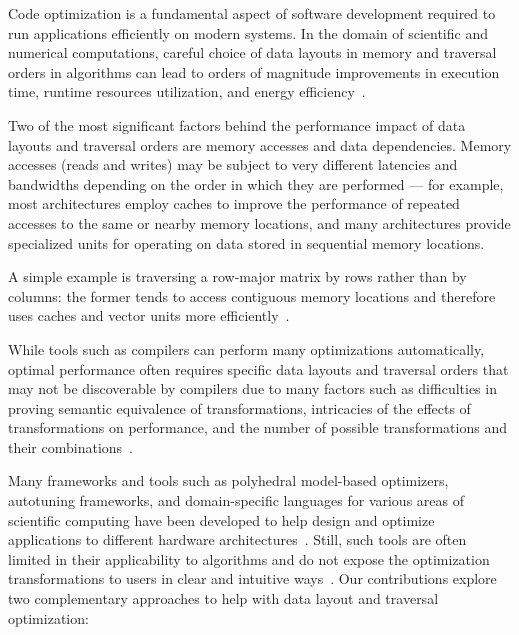 
Code optimization is a fundamental aspect of software development required to run applications efficiently on modern systems. In the domain of scientific and numerical computations, careful choice of data layouts in memory and traversal orders in algorithms can lead to orders of magnitude improvements in execution time, runtime resources utilization, and energy efficiency~\cite{hennessy2019computer,drepper2007every}.

Two of the most significant factors behind the performance impact of data layouts and traversal orders are memory accesses and data dependencies. Memory accesses (reads and writes) may be subject to very different latencies and bandwidths depending on the order in which they are performed --- for example, most architectures employ caches to improve the performance of repeated accesses to the same or nearby memory locations, and many architectures provide specialized units for operating on data stored in sequential memory locations.

A simple example is traversing a row-major matrix by rows rather than by columns: the former tends to access contiguous memory locations and therefore uses caches and vector units more efficiently~\cite{drepper2007every}.

While tools such as compilers can perform many optimizations automatically, optimal performance often requires specific data layouts and traversal orders that may not be discoverable by compilers due to many factors such as difficulties in proving semantic equivalence of transformations, intricacies of the effects of transformations on performance, and the number of possible transformations and their combinations~\cite{bacon1994compiler,allen2001optimizing}.

Many frameworks and tools such as polyhedral model-based optimizers, autotuning frameworks, and domain-specific languages for various areas of scientific computing have been developed to help design and optimize applications to different hardware architectures~\cite{bondhugula2008pluto,ansel2014opentuner,ragan2013halide,baghdadi2019tiramisu}. Still, such tools are often limited in their applicability to algorithms and do not expose the optimization transformations to users in clear and intuitive ways~. Our contributions explore two complementary approaches to help with data layout and traversal optimization: 

